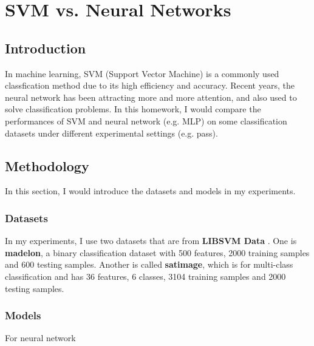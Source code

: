 \documentclass[12pt,a4paper]{article}
\theoremstyle{definition}
\begin{document}
\noindent
\noindent{}

\section{SVM vs. Neural Networks}

\subsection{Introduction}

In machine learning, SVM (Support Vector Machine) is a commonly used classfication method due to its high efficiency and accuracy. Recent years, the neural network has been attracting more and more attention, and also used to solve classification problems. In this homework, I would compare the performances of SVM and neural network (e.g. MLP) on some classification datasets under different experimental settings (e.g. pass).

\subsection{Methodology}

In this section, I would introduce the datasets and models in my experiments.

\subsubsection{Datasets}

In my experiments, I use two datasets that are from \textbf{LIBSVM Data} \cite{dataA}. One is \textbf{madelon}, a binary classification dataset with 500 features, 2000 training samples and 600 testing samples. Another is called \textbf{satimage}, which is for multi-class classification and has 36 features, 6 classes, 3104 training samples and 2000 testing samples.

\subsubsection{Models}

For neural network
\end{document}
